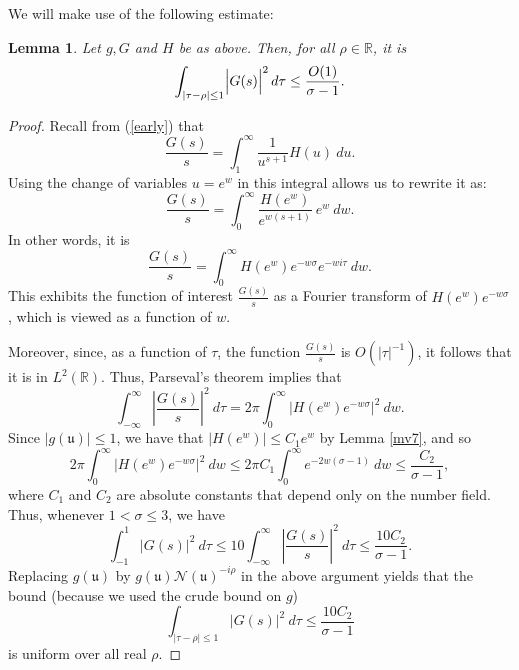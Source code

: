 \documentclass[11pt]{amsart}
\newtheorem{lemma}{Lemma}[section]
\theoremstyle{definition}
\newcommand{\NN}{{\mathcal N}}
\newcommand{\R}{{\mathbb R}}
\newcommand{\mf}{\mathfrak}
\begin{document}

We will make use of the following estimate:

\begin{lemma}\label{firstplancherel}
Let $g, G$ and $H$ be as above. Then, for all $\rho \in \R$, it is
      \begin{equation}\nonumber%
    \begin{split}
       \int_{\vert\tau-\rho\vert\leq 1}\Bigl\vert G(s)\Bigr\vert^{2}\,d\tau\leq \frac{O(1)}{\sigma-1}.
    \end{split}
 \end{equation}
\end{lemma}
\begin{proof}
Recall from (\ref{early}) that
\[
\frac{G(s)}{s}=\int_{1}^{\infty} \frac{1}{u^{s+1}} H(u) \ du.
\]
Using the change of variables $u=e^w$ in this integral allows us to rewrite it as:
\[
\frac{G(s)}{s}=\int_{0}^{\infty} \frac{H(e^{w})}{e^{w(s+1)}} \ e^w \ dw.
\]
In other words, it is
\[
\frac{G(s)}{s}= \int_{0}^{\infty} H(e^{w}) e^{-w\sigma}e^{-wi\tau}\ dw.
\]
This exhibits the function of interest $\frac{G(s)}{s}$ as a Fourier transform of $H(e^w)e^{-w\sigma}$, which is viewed as a function of $w$.

Moreover, since, as a function of $\tau$, the function $\frac{G(s)}{s}$ is $O(|\tau|^{-1})$, it follows that it is in $L^2(\R)$. Thus, Parseval's theorem implies that
\[
\int_{-\infty}^{\infty} \left| \frac{G(s)}{s} \right|^2 \ d\tau = 2\pi \int_{0}^{\infty} \left| H(e^{w}) e^{-w\sigma}\right|^2 \ dw.
\]
Since $|g(\mf u)|\leq 1$, we have that $\vert H(e^{w})\vert\leq C_{1}e^{w}$ by Lemma \ref{mv7}, and so
\[
2\pi \int_{0}^{\infty} \left| H(e^{w}) e^{-w\sigma}\right|^2 \ dw\leq 2\pi C_{1}\int_{0}^{\infty} e^{-2w(\sigma-1)} \ dw \leq \frac{C_2 }{\sigma-1},
\]
where $C_1$ and $C_{2}$ are absolute constants that depend only on the number field. Thus, whenever $1<\sigma \leq 3$, we have
\[
\int_{-1}^1 |G(s)|^2 \ d\tau \leq 10\int_{-\infty}^{\infty} \left| \frac{G(s)}{s}\right|^2 \ d\tau \leq \frac{10 C_2}{\sigma-1}.
\]
Replacing $g(\mf u)$ by $g(\mf u)\NN(\mf u)^{-i\rho}$ in the above argument yields that the bound (because we used the crude bound on $g$) 
\[
\int_{|\tau-\rho| \leq 1} |G(s)|^2 \ d\tau \leq \frac{10  C_2}{\sigma-1}
\]
is uniform over all real $\rho$.
\end{proof}
\end{document}

